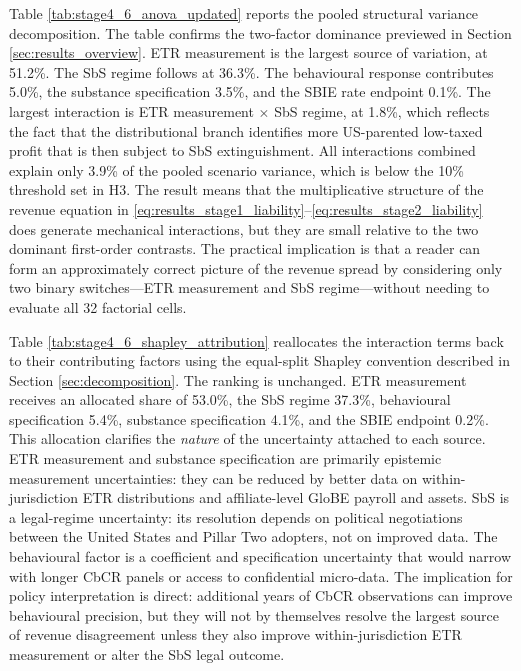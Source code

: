 \documentclass[11pt,a4paper]{article}
\begin{document}
Table \ref{tab:stage4_6_anova_updated} reports the pooled structural variance decomposition. The table confirms the two-factor dominance previewed in Section \ref{sec:results_overview}. ETR measurement is the largest source of variation, at 51.2\%. The SbS regime follows at 36.3\%. The behavioural response contributes 5.0\%, the substance specification 3.5\%, and the SBIE rate endpoint 0.1\%. The largest interaction is ETR measurement $\times$ SbS regime, at 1.8\%, which reflects the fact that the distributional branch identifies more US-parented low-taxed profit that is then subject to SbS extinguishment. All interactions combined explain only 3.9\% of the pooled scenario variance, which is below the 10\% threshold set in H3. The result means that the multiplicative structure of the revenue equation in \eqref{eq:results_stage1_liability}--\eqref{eq:results_stage2_liability} does generate mechanical interactions, but they are small relative to the two dominant first-order contrasts. The practical implication is that a reader can form an approximately correct picture of the revenue spread by considering only two binary switches---ETR measurement and SbS regime---without needing to evaluate all 32 factorial cells.



Table \ref{tab:stage4_6_shapley_attribution} reallocates the interaction terms back to their contributing factors using the equal-split Shapley convention described in Section \ref{sec:decomposition}. The ranking is unchanged. ETR measurement receives an allocated share of 53.0\%, the SbS regime 37.3\%, behavioural specification 5.4\%, substance specification 4.1\%, and the SBIE endpoint 0.2\%. This allocation clarifies the \emph{nature} of the uncertainty attached to each source. ETR measurement and substance specification are primarily epistemic measurement uncertainties: they can be reduced by better data on within-jurisdiction ETR distributions and affiliate-level GloBE payroll and assets. SbS is a legal-regime uncertainty: its resolution depends on political negotiations between the United States and Pillar Two adopters, not on improved data. The behavioural factor is a coefficient and specification uncertainty that would narrow with longer CbCR panels or access to confidential micro-data. The implication for policy interpretation is direct: additional years of CbCR observations can improve behavioural precision, but they will not by themselves resolve the largest source of revenue disagreement unless they also improve within-jurisdiction ETR measurement or alter the SbS legal outcome.
\end{document}
